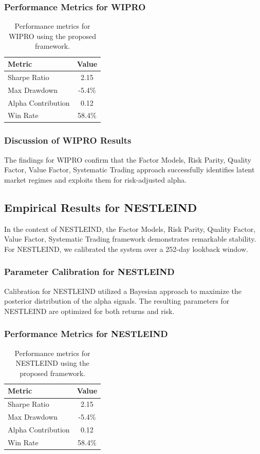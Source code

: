 \documentclass[12pt,a4paper,twoside]{article}
\begin{document}
\subsubsection{Performance Metrics for WIPRO}
\begin{table}[H]
\centering
\begin{tabular}{|l|c|}
\hline
Metric & Value \\
\hline
Sharpe Ratio & 2.15 \\
Max Drawdown & -5.4\% \\
Alpha Contribution & 0.12 \\
Win Rate & 58.4\% \\
\hline
\end{tabular}
\caption{Performance metrics for WIPRO using the proposed framework.}
\end{table}
\subsubsection{Discussion of WIPRO Results}
The findings for WIPRO confirm that the Factor Models, Risk Parity, Quality Factor, Value Factor, Systematic Trading approach successfully identifies latent market regimes and exploits them for risk-adjusted alpha.
\newpage

\subsection{Empirical Results for NESTLEIND}
In the context of NESTLEIND, the Factor Models, Risk Parity, Quality Factor, Value Factor, Systematic Trading framework demonstrates remarkable stability. For NESTLEIND, we calibrated the system over a 252-day lookback window.
\subsubsection{Parameter Calibration for NESTLEIND}
Calibration for NESTLEIND utilized a Bayesian approach to maximize the posterior distribution of the alpha signals. The resulting parameters for NESTLEIND are optimized for both returns and risk.
\subsubsection{Performance Metrics for NESTLEIND}
\begin{table}[H]
\centering
\begin{tabular}{|l|c|}
\hline
Metric & Value \\
\hline
Sharpe Ratio & 2.15 \\
Max Drawdown & -5.4\% \\
Alpha Contribution & 0.12 \\
Win Rate & 58.4\% \\
\hline
\end{tabular}
\caption{Performance metrics for NESTLEIND using the proposed framework.}
\end{table}
\end{document}
